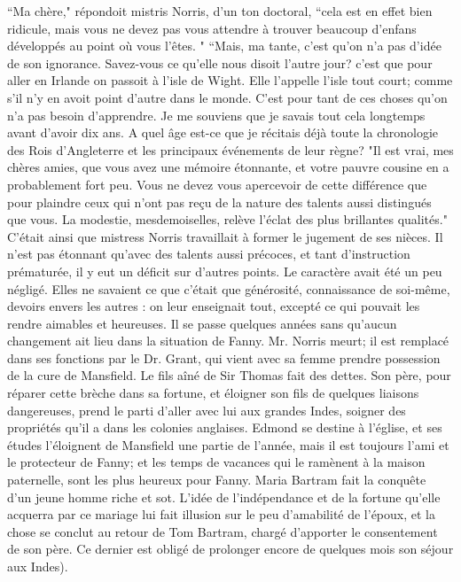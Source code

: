 ``Ma chère," répondoit mistris Norris, d'un ton doctoral, ``cela est en effet bien ridicule, mais vous ne devez pas vous attendre à trouver beaucoup d'enfans développés au point où vous l'êtes. "
``Mais, ma tante, c'est qu'on n'a pas d'idée de son ignorance. Savez-vous ce qu'elle nous disoit l'autre jour? c'est que pour aller en Irlande on passoit à l'isle de Wight. Elle l'appelle l'isle tout court; comme s'il n'y en avoit point d'autre dans le monde. C'est pour\setcounter{page}{502} tant de ces choses qu'on n'a pas besoin d'apprendre. Je me souviens que je savais tout cela longtemps avant d'avoir dix ans. A quel âge est-ce que je récitais déjà toute la chronologie des Rois d'Angleterre et les principaux événements de leur règne?
"Il est vrai, mes chères amies, que vous avez une mémoire étonnante, et votre pauvre cousine en a probablement fort peu. Vous ne devez vous apercevoir de cette différence que pour plaindre ceux qui n'ont pas reçu de la nature des talents aussi distingués que vous. La modestie, mesdemoiselles, relève l'éclat des plus brillantes qualités."
C'était ainsi que mistress Norris travaillait à former le jugement de ses nièces. Il n'est pas étonnant qu'avec des talents aussi précoces, et tant d'instruction prématurée, il y eut un déficit sur d'autres points. Le caractère avait été un peu négligé. Elles ne savaient ce que c'était que générosité, connaissance de soi-même, devoirs envers les autres : on leur enseignait tout, excepté ce qui pouvait les rendre aimables et heureuses.
Il se passe quelques années sans qu'aucun changement ait lieu dans la situation de Fanny. Mr. Norris meurt; il est remplacé dans ses fonctions par le Dr. Grant, qui vient avec\setcounter{page}{503} sa femme prendre possession de la cure de Mansfield. Le fils aîné de Sir Thomas fait des dettes. Son père, pour réparer cette brèche dans sa fortune, et éloigner son fils de quelques liaisons dangereuses, prend le parti d'aller avec lui aux grandes Indes, soigner des propriétés qu'il a dans les colonies anglaises. Edmond se destine à l'église, et ses études l'éloignent de Mansfield une partie de l'année, mais il est toujours l'ami et le protecteur de Fanny; et les temps de vacances qui le ramènent à la maison paternelle, sont les plus heureux pour Fanny. Maria Bartram fait la conquête d'un jeune homme riche et sot. L'idée de l'indépendance et de la fortune qu'elle acquerra par ce mariage lui fait illusion sur le peu d'amabilité de l'époux, et la chose se conclut au retour de Tom Bartram, chargé d'apporter le consentement de son père. Ce dernier est obligé de prolonger encore de quelques mois son séjour aux Indes).
